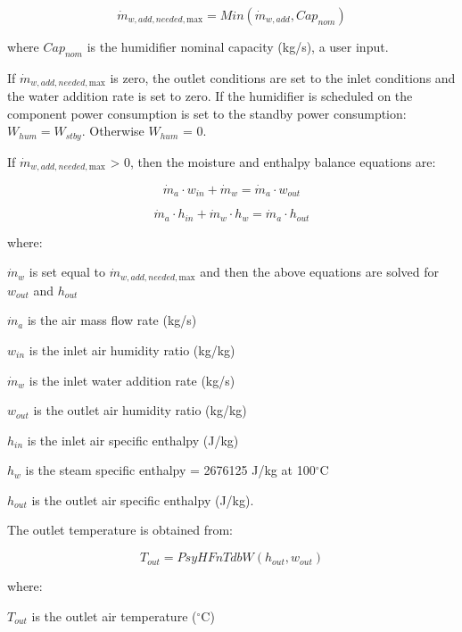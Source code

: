 \begin{equation}
{\dot m_{w,add,needed,{\mathrm{max}}}} = Min({\dot m_{w,add}},Ca{p_{nom}})
\end{equation}

where \(Ca{p_{nom}}\) is the humidifier nominal capacity (kg/s), a user input.

If \({\dot m_{w,add,needed,{\mathrm{max}}}}\) is zero, the outlet conditions are set to the inlet conditions and the water addition rate is set to zero. If the humidifier is scheduled on the component power consumption is set to the standby power consumption: \({W_{hum}} = {W_{stby}}\). Otherwise \({W_{hum}}\) = 0.

If \({\dot m_{w,add,needed,{\mathrm{max}}}}\) \textgreater{} 0, then the moisture and enthalpy balance equations are:

\begin{equation}
{\dot m_a} \cdot {w_{in}} + {\dot m_w} = {\dot m_a} \cdot {w_{out}}
\end{equation}

\begin{equation}
{\dot m_a} \cdot {h_{in}} + {\dot m_w} \cdot {h_w} = {\dot m_a} \cdot {h_{out}}
\end{equation}

where:

\({\dot m_w}\) is set equal to \({\dot m_{w,add,needed,{\mathrm{max}}}}\) and then the above equations are solved for \({w_{out}}\) and \({h_{out}}\)

\({\dot m_a}\) is the air mass flow rate (kg/s)

\({w_{in}}\) is the inlet air humidity ratio (kg/kg)

\({\dot m_w}\) is the inlet water addition rate (kg/s)

\({w_{out}}\) is the outlet air humidity ratio (kg/kg)

\({h_{in}}\) is the inlet air specific enthalpy (J/kg)

\({h_w}\) is the steam specific enthalpy = 2676125 J/kg at 100\(^{\circ}\)C

\({h_{out}}\) is the outlet air specific enthalpy (J/kg).

The outlet temperature is obtained from:

\begin{equation}
{T_{out}} = PsyHFnTdbW({h_{out}},{w_{out}})
\end{equation}

where:

\({T_{out}}\) is the outlet air temperature (\(^{\circ}\)C)

